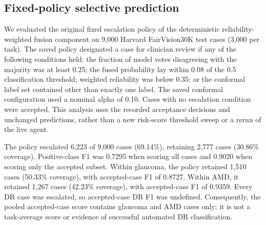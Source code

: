 
\subsection*{Fixed-policy selective prediction}

We evaluated the original fixed escalation policy of the deterministic
reliability-weighted fusion component on 9,000 Harvard FairVision30K test
cases (3,000 per task). The saved policy designated a case for clinician
review if any of the following conditions held: the fraction of model votes
disagreeing with the majority was at least 0.25; the fused probability lay
within 0.08 of the 0.5 classification threshold; weighted reliability was
below 0.35; or the conformal label set contained other than exactly one label.
The saved conformal configuration used a nominal alpha of 0.10. Cases with
no escalation condition were accepted. This analysis uses the recorded
acceptance decisions and unchanged predictions, rather than a new risk-score
threshold sweep or a rerun of the live agent.

The policy escalated 6,223 of 9,000 cases (69.14\%), retaining 2,777 cases
(30.86\% coverage). Positive-class F1 was 0.7295 when scoring all cases and
0.9020 when scoring only the accepted subset. Within glaucoma, the policy
retained 1,510 cases (50.33\% coverage), with accepted-case F1 of 0.8727.
Within AMD, it retained 1,267 cases (42.23\% coverage), with accepted-case
F1 of 0.9359. Every DR case was escalated, so accepted-case DR F1 was
undefined. Consequently, the pooled accepted-case score contains glaucoma
and AMD cases only; it is not a task-average score or evidence of successful
automated DR classification.

